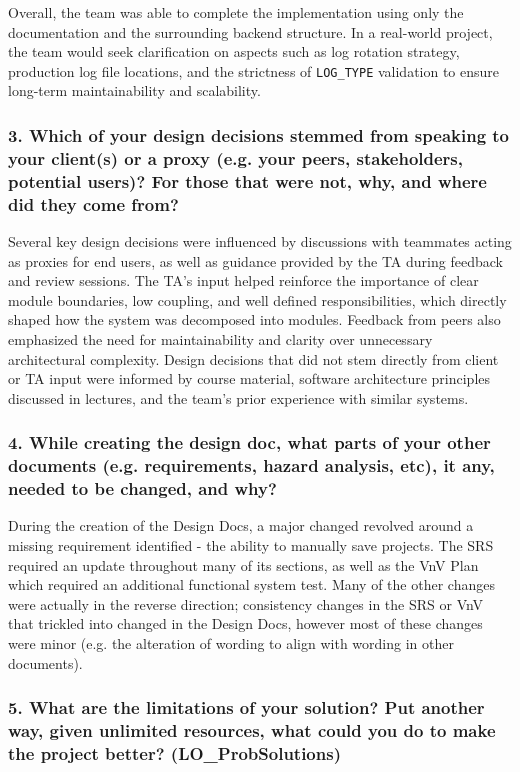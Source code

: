 \documentclass[12pt, titlepage]{article}
\begin{document}
Overall, the team was able to complete the implementation using only the documentation and the surrounding backend structure. In a real-world project, the team would seek clarification on aspects such as log rotation strategy, production log file locations, and the strictness of \texttt{LOG\_TYPE} validation to ensure long-term maintainability and scalability.


\subsubsection*{3. Which of your design decisions stemmed from speaking to your client(s)
or a proxy (e.g. your peers, stakeholders, potential users)? For those that
were not, why, and where did they come from?} Several key design decisions were influenced by discussions with teammates acting as proxies for end users, as well as guidance provided by the TA during feedback and review sessions. The TA’s input helped reinforce the importance of clear module boundaries, low coupling, and well defined responsibilities, which directly shaped how the system was decomposed into modules. Feedback from peers also emphasized the need for maintainability and clarity over unnecessary architectural complexity. Design decisions that did not stem directly from client or TA input were informed by course material, software architecture principles discussed in lectures, and the team’s prior experience with similar systems.

\subsubsection*{4. While creating the design doc, what parts of your other documents (e.g.
requirements, hazard analysis, etc), it any, needed to be changed, and why?}

During the creation of the Design Docs, a major changed revolved around a missing requirement identified - the ability to manually save projects. The SRS required an update throughout many of its sections, as well as the VnV Plan which required an additional functional system test. Many of the other changes were actually in the reverse direction; consistency changes in the SRS or VnV that trickled into changed in the Design Docs, however most of these changes were minor (e.g. the alteration of wording to align with wording in other documents).

\subsubsection*{5. What are the limitations of your solution?  Put another way, given
unlimited resources, what could you do to make the project better? (LO\_ProbSolutions)}
\end{document}
